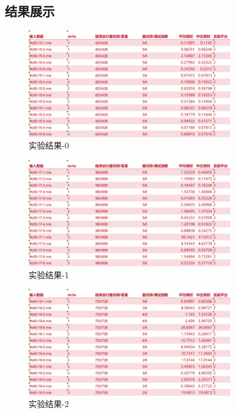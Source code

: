 \documentclass[9pt,dvipsnames,table,UTF8,aspectratio=169]{beamer}
\begin{document}
\subsection{结果展示}
\begin{frame}
	\begin{figure}[H]
		\centering
		\includegraphics[width=0.8\textwidth]{0.png}
		\caption{实验结果-0}\label{results}
	\end{figure}
\end{frame}

\begin{frame}
	\begin{figure}[H]
		\centering
		\includegraphics[width=0.8\textwidth]{1.png}
		\caption{实验结果-1}\label{results}
	\end{figure}
\end{frame}

\begin{frame}
	\begin{figure}[H]
		\centering
		\includegraphics[width=0.8\textwidth]{2.png}
		\caption{实验结果-2}\label{results}
	\end{figure}
\end{frame}
\end{document}
